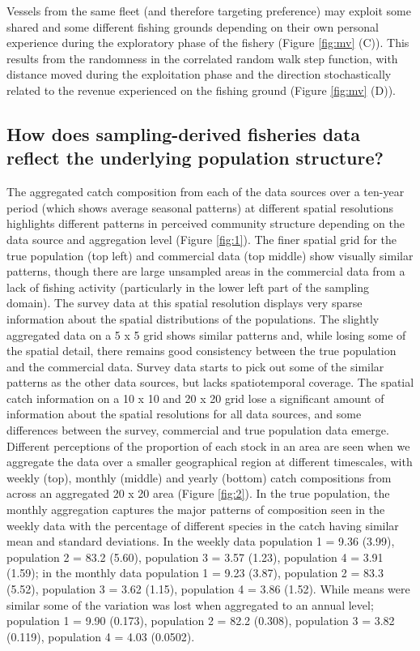 \documentclass[review]{elsarticle}
\begin{document}
Vessels from the same fleet (and therefore targeting preference) may exploit
some shared and some different fishing grounds depending on their own personal
experience during the exploratory phase of the fishery (Figure \ref{fig:mv} (C)).
This results from the randomness in the correlated random walk step function,
with distance moved during the exploitation phase and the direction
stochastically related to the revenue experienced on the fishing ground (Figure
\ref{fig:mv} (D)). 

\subsection{How does sampling-derived fisheries data reflect the underlying
	population structure?}

The aggregated catch composition from each of the data sources over a ten-year
period (which shows average seasonal patterns) at different spatial resolutions
highlights different patterns in perceived community structure depending on the
data source and aggregation level (Figure \ref{fig:1}). The finer spatial grid
for the true population (top left) and commercial data (top middle) show
visually similar patterns, though there are large unsampled areas in the
commercial data from a lack of fishing activity (particularly in the lower left
part of the sampling domain). The survey data at this spatial resolution
displays very sparse information about the spatial distributions of the
populations. The slightly aggregated data on a 5 x 5 grid shows similar
patterns and, while losing some of the spatial detail, there remains good
consistency between the true population and the commercial data. Survey data
starts to pick out some of the similar patterns as the other data sources, but
lacks spatiotemporal coverage. The spatial catch information on a 10 x 10 and
20 x 20 grid lose a significant amount of information about the spatial
resolutions for all data sources, and some differences between the survey,
commercial and true population data emerge. \\

Different perceptions of the proportion of each stock in an area are seen when
we aggregate the data over a smaller geographical region at different
timescales, with weekly (top), monthly (middle) and yearly (bottom) catch
compositions from across an aggregated 20 x 20 area (Figure \ref{fig:2}). In
the true population, the monthly aggregation captures the major patterns of
composition seen in the weekly data with the percentage of different species in
the catch having similar mean and standard deviations.  In the weekly data
population 1 = 9.36 (3.99), population 2 = 83.2 (5.60), population 3 = 3.57 (1.23),
population 4 = 3.91 (1.59); in the monthly data population 1 = 9.23 (3.87), population 2
= 83.3 (5.52), population 3 = 3.62 (1.15), population 4 = 3.86 (1.52). While means
were similar some of the variation was lost when aggregated to an annual level;
population 1 = 9.90 (0.173), population 2 = 82.2 (0.308), population 3 = 3.82 (0.119),
population 4 = 4.03 (0.0502).\\
\end{document}
